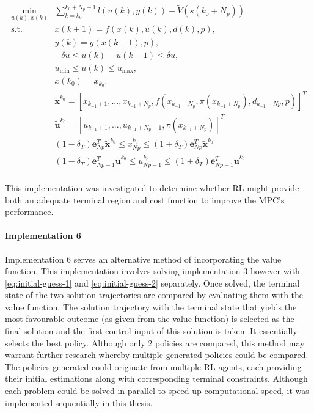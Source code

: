 \begin{subequations} \label{eq:rl-mpc-ocp}
	\begin{align}
		\min_{u(k),x(k)} & \sum_{k = k_0}^{k_0 + N_p-1} {l(u(k), y(k))} - \tilde{V}(s(k_0+N_p)) \\
		\text{s.t.} \quad & x(k+1) = f(x(k), u(k), d(k), p),  \label{eq:rl-mpc-dynamics-constraint} \\
		& y(k) = g(x(k+1), p), \label{eq:rl-mpc-output-constraint} \\
		& -\delta u \leq u(k) - u(k-1) \leq \delta u, \label{eq:rl-mpc-delta-u} \\
		& u_{\min} \leq u(k) \leq u_{\max}, \label{eq:rl-mpc-u-limits}\\
		& x(k_0) = x_{k_0}. \label{eq:rl-pmc-initial} \\
		&\tilde{\mathbf{x}}^{k_0} = [x_{k_{-1} + 1},...,x_{k_{-1} + N_p}, f(x_{k_{-1} + N_p}, \pi(x_{k_{-1} + N_p}), d_{k_{-1} + Np},p)]^T \\ 
		&\tilde{\mathbf{u}}^{k_{0}} = [u_{k_{-1} + 1},...,u_{k_{-1} + N_p - 1}, \pi(x_{k_{-1} + N_p})]^T \\ 
		& (1-\delta_T)\mathbf{e}_{Np}^T \tilde{\mathbf{x}}^{k_0} \leq x^{k_0}_{Np} \leq (1+\delta_T)\mathbf{e}_{Np}^T \tilde{\mathbf{x}}^{k_0}\\
		&(1-\delta_T)\mathbf{e}_{Np-1}^T\tilde{\mathbf{u}}^{k_0} \leq u^{k_0}_{Np-1} \leq (1+\delta_T) \mathbf{e}_{Np-1}^T\tilde{\mathbf{u}}^{k_0}\\
	\end{align}
\end{subequations}

This implementation was investigated to determine whether RL might provide both an adequate terminal region and cost function to improve the MPC's performance.


\paragraph{Implementation 6}
Implementation 6 serves an alternative method of incorporating the value function. This implementation involves solving implementation 3 however with \autoref{eq:initial-guess-1} and \autoref{eq:initial-guess-2} separately. Once solved, the terminal state of the two solution trajectories are compared by evaluating them with the value function. The solution trajectory with the terminal state that yields the most favourable outcome (as given from the value function) is selected as the final solution and the first control input of this solution is taken. It essentially selects the best policy. Although only 2 policies are compared, this method may warrant further research whereby multiple generated policies could be compared. The policies generated could originate from multiple RL agents, each providing their initial estimations along with corresponding terminal constraints. Although each problem could be solved in parallel to speed up computational speed, it was implemented sequentially in this thesis.



